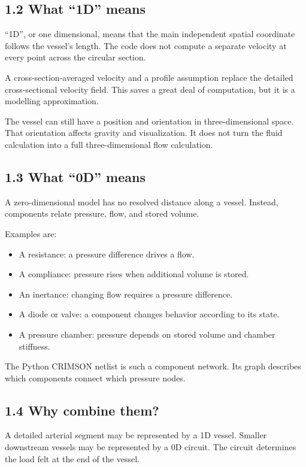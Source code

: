 \documentclass[11pt,a4paper]{article}
\begin{document}
\subsection{1.2 What \textquotedblleft{}1D\textquotedblright{} means}
\textquotedblleft{}1D\textquotedblright{}, or one dimensional, means that the main independent spatial coordinate follows the vessel's length. The code does not compute a separate velocity at every point across the circular section.

A cross-section-averaged velocity and a profile assumption replace the detailed cross-sectional velocity field. This saves a great deal of computation, but it is a modelling approximation.

The vessel can still have a position and orientation in three-dimensional space. That orientation affects gravity and visualization. It does not turn the fluid calculation into a full three-dimensional flow calculation.

\subsection{1.3 What \textquotedblleft{}0D\textquotedblright{} means}
A zero-dimensional model has no resolved distance along a vessel. Instead, components relate pressure, flow, and stored volume.

Examples are:


\begin{itemize}
\item A resistance: a pressure difference drives a flow.


\item A compliance: pressure rises when additional volume is stored.


\item An inertance: changing flow requires a pressure difference.


\item A diode or valve: a component changes behavior according to its state.


\item A pressure chamber: pressure depends on stored volume and chamber stiffness.


\end{itemize}
The Python CRIMSON netlist is such a component network. Its graph describes which components connect which pressure nodes.

\subsection{1.4 Why combine them?}
A detailed arterial segment may be represented by a 1D vessel. Smaller downstream vessels may be represented by a 0D circuit. The circuit determines the load felt at the end of the vessel.
\end{document}
